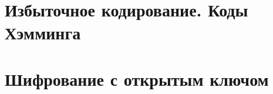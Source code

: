\documentclass[12pt, fleqn]{article}
\begin{document}
  

  

  

  

  

  

  

  

  \section{Избыточное кодирование. Коды Хэмминга}
  \newpage

  \section{Шифрование с открытым ключом}
  \newpage
\end{document}
